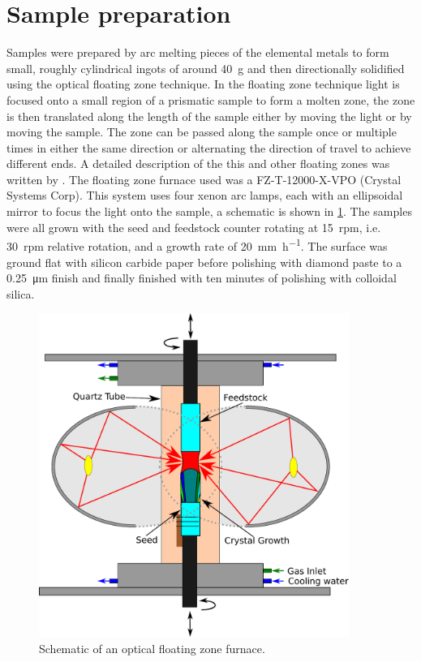 \section{Sample preparation}


Samples were prepared by arc melting pieces of the elemental metals to form small, roughly cylindrical ingots of around \SI{40}{\gram} and then directionally solidified using the optical floating zone technique. In the floating zone technique light is focused onto a small region of a prismatic sample to form a molten zone, the  zone is then translated along the length of the sample either by moving the light or by moving the sample. The zone can be passed along the sample once or multiple times in either the same direction or alternating the direction of travel to achieve different ends. A detailed description of the this and other floating zones was written by \cite{Pfann1966}. The floating zone furnace used was a FZ-T-12000-X-VPO (Crystal Systems Corp). This system uses four xenon arc lamps, each with an ellipsoidal mirror to focus the light onto the sample, a schematic is shown in \ref{fig:OFZF_schematic}. The samples were all grown with the seed and feedstock counter rotating at \num{15}~rpm, i.e. \num{30}~rpm relative rotation, and a growth rate of \SI{20}{\milli\meter\per\hour}. The surface was ground flat with silicon carbide paper before polishing with diamond paste to a \SI{0.25}{\micro\meter} finish and finally finished with ten minutes of polishing with colloidal silica.


\begin{figure}
\centering
\includegraphics[width=0.9\textwidth]{Image_Furnace_Schematic}
\caption{Schematic of an optical floating zone furnace.\label{fig:OFZF_schematic}}
\end{figure}











